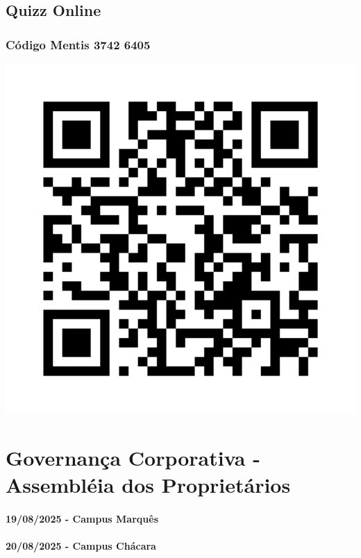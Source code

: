 \documentclass[
]{book}
\begin{document}
\section{Quizz Online}\label{quizz-online}

\subsection{Código Mentis 3742 6405}\label{cuxf3digo-mentis-3742-6405}

\href{https://www.menti.com/al4av68ojfs4}{\includegraphics[width=7.10417in,height=\textheight]{images/02-2025-08-12_13/11-exercicios-aula-02.png}}

\chapter{Governança Corporativa - Assembléia dos Proprietários}\label{governanuxe7a-corporativa---assembluxe9ia-dos-proprietuxe1rios}

\subsubsection*{19/08/2025 - Campus Marquês}\label{campus-marquuxeas-2}

\subsubsection*{20/08/2025 - Campus Chácara}\label{campus-chuxe1cara-2}
\end{document}

